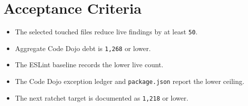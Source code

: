 \section{Acceptance Criteria}\label{record-230-acceptance-criteria}

\begin{itemize}
\tightlist
\item
  The selected touched files reduce live findings by at least \texttt{5\allowbreak{}0}.
\item
  Aggregate Code Dojo debt is \texttt{1\allowbreak{},\allowbreak{}2\allowbreak{}6\allowbreak{}8} or lower.
\item
  The ESLint baseline records the lower live count.
\item
  The Code Dojo exception ledger and \texttt{p\allowbreak{}a\allowbreak{}c\allowbreak{}k\allowbreak{}a\allowbreak{}g\allowbreak{}e\allowbreak{}.\allowbreak{}j\allowbreak{}s\allowbreak{}o\allowbreak{}n} report the lower ceiling.
\item
  The next ratchet target is documented as \texttt{1\allowbreak{},\allowbreak{}2\allowbreak{}1\allowbreak{}8} or lower.
\end{itemize}


